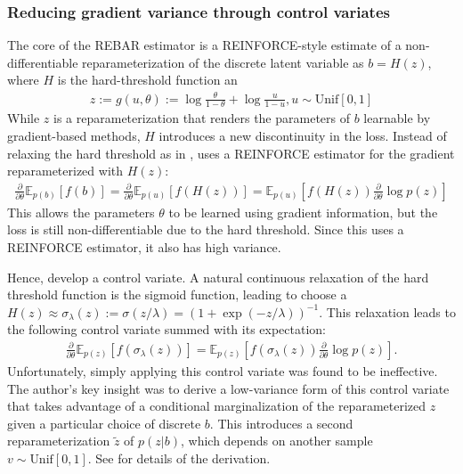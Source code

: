 \documentclass{article}
\begin{document}

\subsubsection{Reducing gradient variance through control variates}
The core of the REBAR estimator is a REINFORCE-style estimate of a non-differentiable reparameterization of the discrete latent variable as $b=H(z)$, where $H$ is the hard-threshold function an
\begin{align}
z := g(u, \theta) := \log\frac{\theta}{1-\theta} + \log\frac{u}{1-u}, u \sim \text{Unif}[0,1]
\end{align}
While $z$ is a reparameterization that renders the parameters of $b$ learnable by gradient-based methods, $H$ introduces a new discontinuity in the loss.
Instead of relaxing the hard threshold as in \cite{maddison2016concrete}, \cite{tucker2017rebar} uses a REINFORCE estimator for the gradient reparameterized with $H(z)$:
\begin{align}
    \frac{\partial}{\partial \theta} \mathbb{E}_{p(b)}[f(b)] = \frac{\partial}{\partial \theta} \mathbb{E}_{p(u)}[f(H(z))] = \mathbb{E}_{p(u)}[f(H(z))\frac{\partial}{\partial \theta}\log p(z)]
\end{align}
This allows the parameters $\theta$ to be learned using gradient information, but the loss is still non-differentiable due to the hard threshold.
Since this uses a REINFORCE estimator, it also has high variance.

Hence, \cite{tucker2017rebar} develop a control variate. A natural continuous relaxation of the hard threshold function is the sigmoid function, leading \cite{tucker2017rebar} to choose a $H(z) \approx \sigma_\lambda(z) := \sigma(z / \lambda) = (1+\exp( - z / \lambda))^{-1}$.
This relaxation leads to the following control variate summed with its expectation:
\begin{align}
    \frac{\partial}{\partial \theta} \mathbb{E}_{p(z)}[f(\sigma_\lambda(z))] =  \mathbb{E}_{p(z)}[f(\sigma_\lambda(z))\frac{\partial}{\partial \theta}\log p(z)].
\end{align}
Unfortunately, simply applying this control variate was found to be ineffective. 
The author's key insight was to derive a low-variance form of this control variate that takes advantage of a conditional marginalization of the reparameterized $z$ given a particular choice of discrete $b$.
This introduces a second reparameterization $\tilde{z}$ of $p(z|b)$, which depends on another sample $v\sim \text{Unif}[0,1]$.
See \cite{tucker2017rebar} for details of the derivation.
\end{document}
